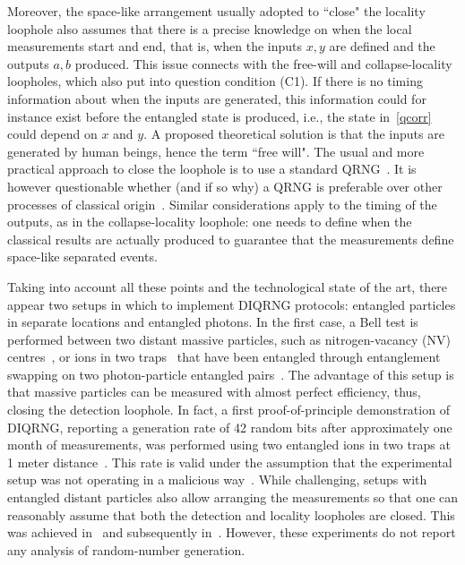 \documentclass[11pt,a4paper]{article}
\begin{document}
Moreover, the space-like arrangement usually adopted to ``close" the locality loophole also assumes that there is a precise knowledge on when the local measurements start and end, that is, when the inputs $x,y$ are defined and the outputs $a,b$ produced. This issue connects with the free-will and collapse-locality loopholes, which also put into question condition (C1). If there is no timing information about when the inputs are generated, this information could for instance exist before the entangled state is produced, i.e., the state in~\eqref{qcorr} could depend on $x$ and $y$. A proposed theoretical solution is that the inputs are generated by human beings, hence the term ``free will". The usual and more practical approach to close the loophole is to use a standard QRNG~\cite{qrngloop}. It is however questionable whether (and if so why) a QRNG is preferable over other processes of classical origin~\cite{Pironioqrng}. Similar considerations apply to the timing of the outputs, as in the collapse-locality loophole: one needs to define when the classical results are actually produced to guarantee that the measurements define space-like separated events.

Taking into account all these points and the technological state of the art, there appear two setups in which to implement DIQRNG protocols:  entangled particles in separate locations and entangled photons. In the first case, a Bell test is performed between two distant massive particles, such as nitrogen-vacancy (NV) centres~\cite{hanson}, or ions in two traps~\cite{monroe,weinfurter} that have been entangled through entanglement swapping on two photon-particle entangled pairs~\cite{entsw,simon}. The advantage of this setup is that massive particles can be measured with almost perfect efficiency, thus, closing the detection loophole. In fact, a first proof-of-principle demonstration of DIQRNG, reporting a generation rate of 42 random bits after approximately one month of measurements, was performed using two entangled ions in two traps at 1 meter distance~\cite{Pironio}.
This rate is valid under the assumption that the experimental setup was not operating in a malicious way~\cite{ColbeckKent}.
While challenging, setups with entangled distant particles also allow arranging the measurements so that one can reasonably assume that both the detection and locality loopholes are closed. This was achieved in~\cite{hanson} and subsequently in~\cite{hanson2}.
However, these experiments do not report any analysis of random-number generation. %
\end{document}
